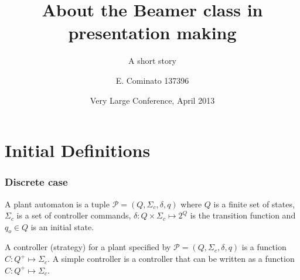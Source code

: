 \documentclass[table]{beamer}
\title[About Beamer] %
{About the Beamer class in presentation making}
\subtitle{A short story}
\author[Enrico] %
{E. Cominato 137396\inst{1}}
\institute %
{
  \inst{1}%
  Dipartimento di Scienze Matematiche, Informatiche e Fisiche\\
  Università degli studi di Udine
}
\date[VLC 2013] %
{Very Large Conference, April 2013}
\begin{document}
\frame{\titlepage}

\section{Initial Definitions}
\begin{frame}
\frametitle{Discrete case}
\begin{dfn}[Plant]
A plant automaton is a tuple $\mathcal{P}=(Q,\Sigma_c,\delta, q)$ where
$Q$ is a finite set of states, $\Sigma_c$ is a set of controller commands, $\delta:Q \times \Sigma_c \longmapsto 2^Q$ is the transition function and $q_o \in Q$ is an initial state.
\end{dfn}
\begin{dfn}[Controllers]
A controller (strategy) for a plant specified by $\mathcal{P}=(Q,\Sigma_c,\delta, q)$ is a function $C:Q^+\longmapsto \Sigma_c$. A simple controller is a controller that can be written as a function $C:Q^+\longmapsto \Sigma_c$.
\end{dfn}
\end{frame}
\end{document}
